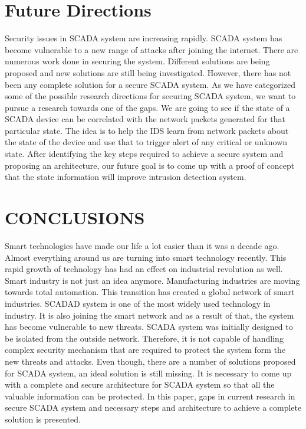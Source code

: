 \documentclass[letterpaper, 10 pt, conference]{ieeeconf}  %
\begin{document}
\section{Future Directions}
Security issues in SCADA system are increasing rapidly. SCADA system has become vulnerable to a new range of attacks after joining the internet. There are numerous work done in securing the system. Different solutions are being proposed and new solutions are still being investigated. However, there has not been any complete solution for a secure SCADA system. As we have categorized some of the possible research directions for securing SCADA system, we want to pursue a research towards one of the gaps. We are going to see if the state of a SCADA device can be correlated with the network packets generated for that particular state. The idea is to help the IDS learn from network packets about the state of the device and use that to trigger alert of any critical or unknown state. After identifying the key steps required to achieve a secure system and proposing an architecture, our future goal is to come up with a proof of concept that the state information will improve intrusion detection system.
\
   
\section{CONCLUSIONS}
Smart technologies have made our life a lot easier than it was a decade ago. Almost everything around us are turning into smart technology recently. This rapid growth of technology has had an effect on industrial revolution as well. Smart industry is not just an idea anymore. Manufacturing industries are moving towards total automation. This transition has created a global network of smart industries. SCADAD system is one of the most widely used technology in industry. It is also joining the smart network and as a result of that, the system has become vulnerable to new threats. SCADA system was initially designed to be isolated from the outside network. Therefore, it is not capable of handling complex security mechanism that are required to protect the system form the new threats and attacks. Even though, there are a number of solutions proposed for SCADA system, an ideal solution is still missing. It is necessary to come up with a complete and secure architecture for SCADA system so that all the valuable information can be protected. In this paper, gaps in current research in secure SCADA system and necessary steps and architecture to achieve a complete solution is presented.
\addtolength{\textheight}{-12cm}   %
\end{document}
